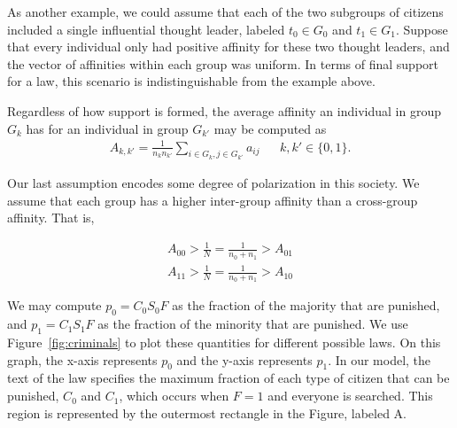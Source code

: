 As another example, we could assume that each of the two subgroups of citizens included a single influential thought leader, labeled $t_0 \in G_0$ and $t_1 \in G_1$.  Suppose that every individual only had positive affinity for these two thought leaders, and the vector of affinities within each group was uniform.  In terms of final support for a law, this scenario is indistinguishable from the example above.


Regardless of how support is formed, the average affinity an individual in group $G_k$ has for an individual in group $G_{k'}$ may be computed as 
\begin{align}
A_{k,k'} = \frac{1}{n_k n_{k'}}\sum_{i \in G_k,j\in G_{k'}} a_{ij} && \text{$k,k'\in\{0,1\}$}.
\end{align} %


Our last assumption encodes some degree of polarization in this society.  We assume that each group has a higher inter-group affinity than a cross-group affinity.  That is, 

\begin{align} 
A_{00} > \frac{1}{N}=\frac{1}{n_0+n_1} > A_{01} \\
A_{11} > \frac{1}{N}=\frac{1}{n_0+n_1}>  A_{10}
\end{align}


We may compute %
$p_0 = C_0S_0F$ as the fraction of the majority that are punished, and $p_1 = C_1S_1F$ as the fraction of the minority that are punished.  We use Figure~\ref{fig:criminals} to plot these quantities for different possible laws.  On this graph, the x-axis represents $p_0$ and the y-axis represents $p_1$.  In our model, the text of the law specifies the maximum fraction of each type of citizen that can be punished, $C_0$ and $C_1$, which occurs when $F=1$ and everyone is searched.  This region is represented by the outermost rectangle in the Figure, labeled A.



